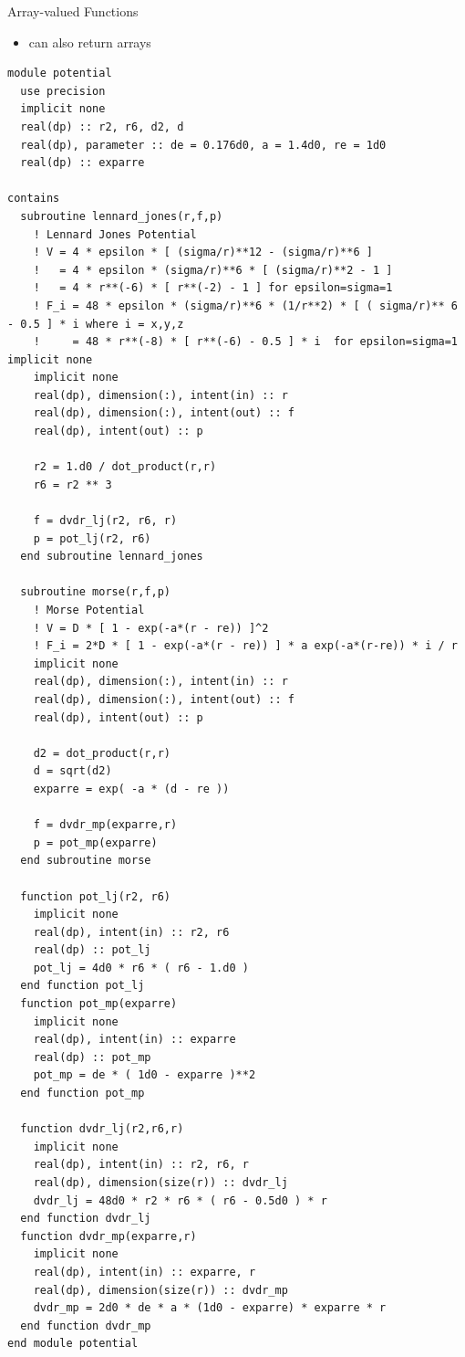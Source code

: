 \documentclass[10pt,t]{beamer}
\begin{document}
\begin{frame}[fragile]{Array-valued Functions}
  \begin{itemize}
    \item {} can also return arrays
  \end{itemize}
      \begin{lstlisting}[language={[90]Fortran},basicstyle=\fontsize{4}{5}\selectfont\ttfamily,multicols=2]
module potential
  use precision
  implicit none
  real(dp) :: r2, r6, d2, d
  real(dp), parameter :: de = 0.176d0, a = 1.4d0, re = 1d0
  real(dp) :: exparre
  
contains
  subroutine lennard_jones(r,f,p)
    ! Lennard Jones Potential
    ! V = 4 * epsilon * [ (sigma/r)**12 - (sigma/r)**6 ]
    !   = 4 * epsilon * (sigma/r)**6 * [ (sigma/r)**2 - 1 ]
    !   = 4 * r**(-6) * [ r**(-2) - 1 ] for epsilon=sigma=1
    ! F_i = 48 * epsilon * (sigma/r)**6 * (1/r**2) * [ ( sigma/r)** 6 - 0.5 ] * i where i = x,y,z
    !     = 48 * r**(-8) * [ r**(-6) - 0.5 ] * i  for epsilon=sigma=1    implicit none
    implicit none
    real(dp), dimension(:), intent(in) :: r
    real(dp), dimension(:), intent(out) :: f
    real(dp), intent(out) :: p

    r2 = 1.d0 / dot_product(r,r)
    r6 = r2 ** 3

    f = dvdr_lj(r2, r6, r)
    p = pot_lj(r2, r6)
  end subroutine lennard_jones

  subroutine morse(r,f,p)
    ! Morse Potential
    ! V = D * [ 1 - exp(-a*(r - re)) ]^2
    ! F_i = 2*D * [ 1 - exp(-a*(r - re)) ] * a exp(-a*(r-re)) * i / r  
    implicit none
    real(dp), dimension(:), intent(in) :: r
    real(dp), dimension(:), intent(out) :: f
    real(dp), intent(out) :: p

    d2 = dot_product(r,r)
    d = sqrt(d2)
    exparre = exp( -a * (d - re ))
    
    f = dvdr_mp(exparre,r)
    p = pot_mp(exparre)
  end subroutine morse

  function pot_lj(r2, r6)
    implicit none
    real(dp), intent(in) :: r2, r6
    real(dp) :: pot_lj
    pot_lj = 4d0 * r6 * ( r6 - 1.d0 )
  end function pot_lj
  function pot_mp(exparre)
    implicit none
    real(dp), intent(in) :: exparre
    real(dp) :: pot_mp
    pot_mp = de * ( 1d0 - exparre )**2
  end function pot_mp

  function dvdr_lj(r2,r6,r)
    implicit none
    real(dp), intent(in) :: r2, r6, r
    real(dp), dimension(size(r)) :: dvdr_lj
    dvdr_lj = 48d0 * r2 * r6 * ( r6 - 0.5d0 ) * r
  end function dvdr_lj
  function dvdr_mp(exparre,r)
    implicit none
    real(dp), intent(in) :: exparre, r
    real(dp), dimension(size(r)) :: dvdr_mp
    dvdr_mp = 2d0 * de * a * (1d0 - exparre) * exparre * r
  end function dvdr_mp
end module potential
      \end{lstlisting}
\end{frame}
\end{document}
